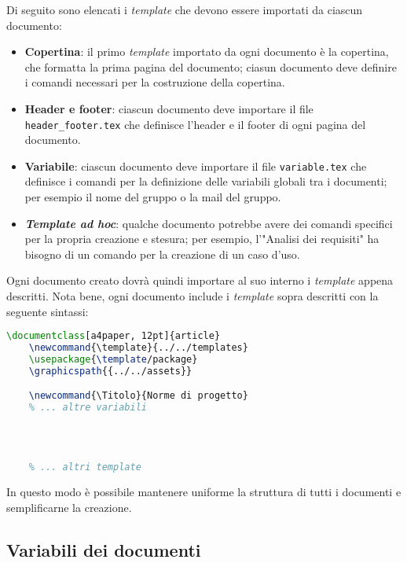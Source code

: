Di seguito sono elencati i \textit{template} che devono essere importati da
ciascun documento:
\begin{itemize}
	\item \textbf{Copertina}: il primo \textit{template} importato da ogni
	      documento è la copertina, che formatta la prima pagina del documento;
	      ciasun documento deve definire i comandi necessari per la costruzione
	      della copertina.

	\item \textbf{Header e footer}: ciascun documento deve importare il file
	      \texttt{header\_footer.tex} che definisce l'header e il footer di ogni
	      pagina del documento.

	\item \textbf{Variabile}: ciascun documento deve importare il file
	      \texttt{variable.tex} che definisce i comandi per la definizione delle
	      variabili globali tra i documenti; per esempio il nome del gruppo o la
	      mail del gruppo.

	\item \textbf{\textit{Template ad hoc}}: qualche documento potrebbe avere
	      dei comandi specifici per la propria creazione e stesura; per esempio,
	      l'"Analisi dei requisiti" ha bisogno di un comando per la creazione di
	      un caso d'uso.
\end{itemize}
Ogni documento creato dovrà quindi importare al suo interno i \textit{template}
appena descritti.
Nota bene, ogni documento include i \textit{template} sopra descritti con la
seguente sintassi:
\begin{lstlisting}[language=TeX]
	\documentclass[a4paper, 12pt]{article}
	\newcommand{\template}{../../templates}
	\usepackage{\template/package}
	\graphicspath{{../../assets}}

	\newcommand{\Titolo}{Norme di progetto}
	% ... altre variabili

	
	
	
	% ... altri template
\end{lstlisting}

In questo modo è possibile mantenere uniforme la struttura di tutti i
documenti e semplificarne la creazione.

\subsection{Variabili dei documenti}

